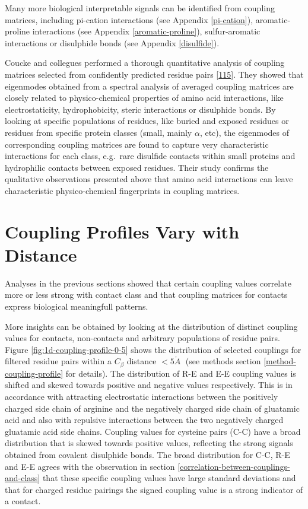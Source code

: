 \documentclass[12pt,a4paper,twoside]{book}
\newcommand{\Cb}{C_\beta}
\newcommand{\angstrom}{\mathring{A} \;}
\theoremstyle{definition}
\theoremstyle{definition}
\theoremstyle{remark}
\begin{document}
Many more biological interpretable signals can be identified from
coupling matrices, including pi-cation interactions (see Appendix
\ref{pi-cation}), aromatic-proline interactions (see Appendix
\ref{aromatic-proline}), sulfur-aromatic interactions or disulphide
bonds (see Appendix \ref{disulfide}).

Coucke and collegues performed a thorough quantitative analysis of
coupling matrices selected from confidently predicted residue pairs
{[}\protect\hyperlink{ref-Coucke2016}{115}{]}. They showed that
eigenmodes obtained from a spectral analysis of averaged coupling
matrices are closely related to physico-chemical properties of amino
acid interactions, like electrostaticity, hydrophobicity, steric
interactions or disulphide bonds. By looking at specific populations of
residues, like buried and exposed residues or residues from specific
protein classes (small, mainly \(\alpha\), etc), the eigenmodes of
corresponding coupling matrices are found to capture very characteristic
interactions for each class, e.g.~rare disulfide contacts within small
proteins and hydrophilic contacts between exposed residues. Their study
confirms the qualitative observations presented above that amino acid
interactions can leave characteristic physico-chemical fingerprints in
coupling matrices.

\section{Coupling Profiles Vary with
Distance}\label{coupling-profiles-vary-with-distance}

Analyses in the previous sections showed that certain coupling values
correlate more or less strong with contact class and that coupling
matrices for contacts express biological meaningfull patterns.

More insights can be obtained by looking at the distribution of distinct
coupling values for contacts, non-contacts and arbitrary populations of
residue pairs. Figure \ref{fig:1d-coupling-profile-0-5} shows the
distribution of selected couplings for filtered residue pairs within a
\(\Cb\) distance \(< 5\angstrom\) (see methods section
\ref{method-coupling-profile} for details). The distribution of R-E and
E-E coupling values is shifted and skewed towards positive and negative
values respectively. This is in accordance with attracting electrostatic
interactions between the positively charged side chain of arginine and
the negatively charged side chain of gluatamic acid and also with
repulsive interactions between the two negatively charged gluatamic acid
side chains. Coupling values for cysteine pairs (C-C) have a broad
distribution that is skewed towards positive values, reflecting the
strong signals obtained from covalent disulphide bonds. The broad
distribution for C-C, R-E and E-E agrees with the observation in section
\ref{correlation-between-couplings-and-class} that these specific
coupling values have large standard deviations and that for charged
residue pairings the signed coupling value is a strong indicator of a
contact.
\end{document}

